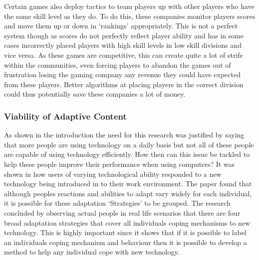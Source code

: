 \documentclass[11pt]{article}
\begin{document}
Certain games also deploy tactics to team players up with other players who have the same skill level as they do. To do this, these companies monitor players scores and move them up or down in `rankings' appropriately. This is not a perfect system though as scores do not perfectly reflect player ability and has in some cases incorrectly placed players with high skill levels in low skill divisions and vice versa. As these games are competitive, this can create quite a lot of strife within the communities, even forcing players to abandon the games out of frustration losing the gaming company any revenue they could have expected from these players. Better algorithms at placing players in the correct division could thus potentially save these companies a lot of money.


\vspace{6.0 mm}

\subsubsection{Viability of Adaptive Content}

As shown in the introduction the need for this research was justified by saying that more people are using technology on a daily basis but not all of these people are capable of using technology efficiently. How then can this issue be tackled to help these people improve their performance when using computers? It was shown in \citep{beaudry2005understanding} how users of varying technological ability responded to a new technology being introduced in to their work environment. The paper found that although peoples reactions and abilities to adapt vary widely for each individual, it is possible for these adaptation `Strategies' to be grouped. The research concluded by observing actual people in real life scenarios that there are four broad adaptation strategies that cover all individuals coping mechanisms to new technology. This is highly important since it shows that if it is possible to label an individuals coping mechanism and behaviour then it is possible to develop a method to help any individual cope with new technology.

\vspace{6.0 mm}
\end{document}
